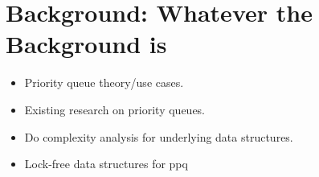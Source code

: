 \section{Background: Whatever the Background is}\label{sec:background}






\begin{itemize}
	\item Priority queue theory/use cases.
	\item Existing research on priority queues.
	\item Do complexity analysis for underlying data structures.
	\item Lock-free data structures for ppq
\end{itemize}